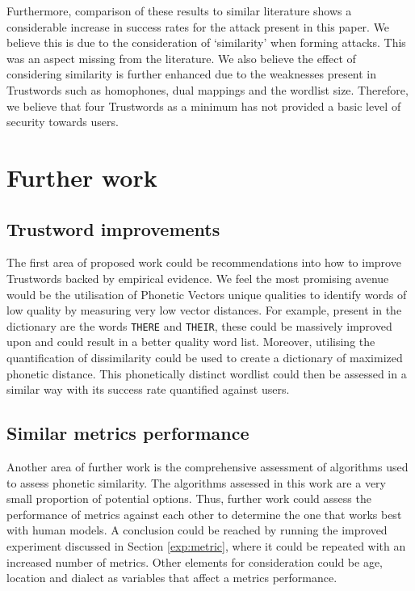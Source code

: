 Furthermore, comparison of these results to similar literature shows a considerable increase in success rates for the attack present in this paper. We believe this is due to the consideration of `similarity' when forming attacks. This was an aspect missing from the literature.
We also believe the effect of considering similarity is further enhanced due to the  weaknesses present in Trustwords such as homophones, dual mappings and the wordlist size. Therefore, we believe that four Trustwords as a minimum has not provided a basic level of security towards users.

\section{Further work}

\subsection*{Trustword improvements}
The first area of proposed work could be recommendations into how to improve Trustwords backed by empirical evidence. We feel the most promising avenue would be the utilisation of Phonetic Vectors unique qualities to identify words of low quality by measuring very low vector distances. For example, present in the dictionary are the words \verb|THERE| and \verb|THEIR|, these could be massively improved upon and could result in a better quality word list. Moreover, utilising the quantification of dissimilarity could be used to create a dictionary of maximized phonetic distance. This phonetically distinct wordlist could then be assessed in a similar way with its success rate quantified against users.

\subsection*{Similar metrics performance}
Another area of further work is the comprehensive assessment of algorithms used to assess phonetic similarity. The algorithms assessed in this work are a very small proportion of potential options. Thus, further work could assess the performance of metrics against each other to determine the one that works best with human models. A conclusion could be reached by running the improved experiment discussed in Section \ref{exp:metric}, where it could be repeated with an increased number of metrics. Other elements for consideration could be age, location and dialect as variables that affect a metrics performance. 

